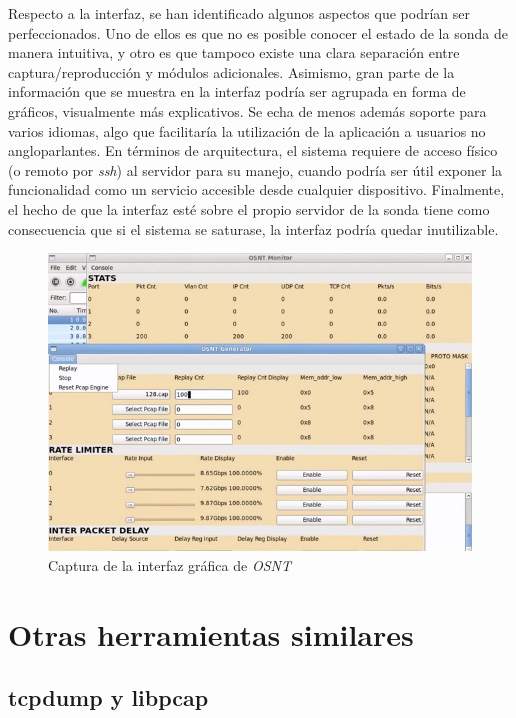 Respecto a la interfaz, se han identificado algunos aspectos que podrían ser perfeccionados.
Uno de ellos es que no es posible conocer el estado de la sonda de manera intuitiva, y otro es que tampoco existe una clara separación entre captura/reproducción y módulos adicionales.
Asimismo, gran parte de la información que se muestra en la interfaz podría ser agrupada en forma de gráficos, visualmente más explicativos.
Se echa de menos además soporte para varios idiomas, algo que facilitaría la utilización de la aplicación a usuarios no angloparlantes.
En términos de arquitectura, el sistema requiere de acceso físico (o remoto por \textit{ssh}) al servidor para su manejo, cuando podría ser útil exponer la funcionalidad como un servicio accesible desde cualquier dispositivo.
Finalmente, el hecho de que la interfaz esté sobre el propio servidor de la sonda tiene como consecuencia que si el sistema se saturase, la interfaz podría quedar inutilizable.

\begin{figure}[H]
  \centering
  \includegraphics[width=\textwidth,clip=true]{graphics/capturas/osnt}
  \caption{Captura de la interfaz gráfica de \textit{OSNT}}
  \label{fig:osnt}
\end{figure}

\section{Otras herramientas similares\label{sec:eda:otras}}

\subsection*{tcpdump y libpcap\label{sec:eda:tcpdump}}

